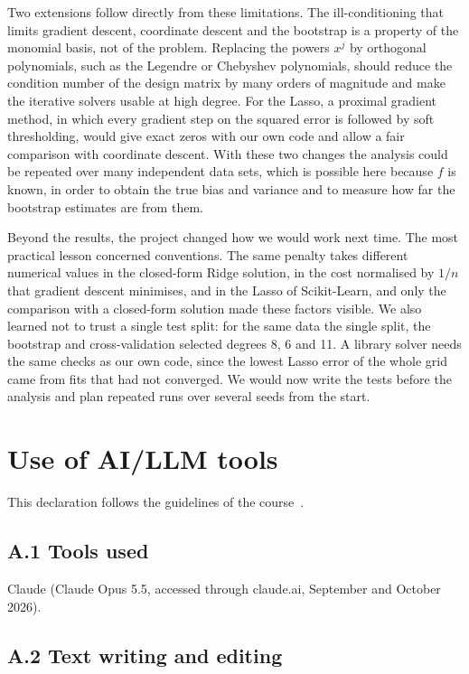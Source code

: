 \documentclass[aps,reprint,amsmath,amssymb,nofootinbib,floatfix]{revtex4-2}
\begin{document}
Two extensions follow directly from these limitations. The ill-conditioning that limits gradient
descent, coordinate descent and the bootstrap is a property of the monomial basis, not of the
problem. Replacing the powers $x^j$ by orthogonal polynomials, such as the Legendre or Chebyshev
polynomials, should reduce the condition number of the design matrix by many orders of magnitude
and make the iterative solvers usable at high degree. For the Lasso, a proximal gradient method,
in which every gradient step on the squared error is followed by soft thresholding, would give
exact zeros with our own code and allow a fair comparison with coordinate descent. With these two
changes the analysis could be repeated over many independent data sets, which is possible here
because $f$ is known, in order to obtain the true bias and variance and to measure how far the
bootstrap estimates are from them.

Beyond the results, the project changed how we would work next time. The most practical lesson
concerned conventions. The same penalty takes different numerical values in the closed-form Ridge
solution, in the cost normalised by $1/n$ that gradient descent minimises, and in the Lasso of
Scikit-Learn, and only the comparison with a closed-form solution made these factors visible. We
also learned not to trust a single test split: for the same data the single split, the bootstrap
and cross-validation selected degrees 8, 6 and 11. A library solver needs the same checks as our
own code, since the lowest Lasso error of the whole grid came from fits that had not converged.
We would now write the tests before the analysis and plan repeated runs over several seeds from
the start.

\appendix

\section{Use of AI/LLM tools}\label{app:llm}

This declaration follows the guidelines of the course~\cite{llmguidelines}.

\subsection*{A.1 Tools used}

Claude (Claude Opus 5.5, accessed through claude.ai, September and October 2026).

\subsection*{A.2 Text writing and editing}
\end{document}
